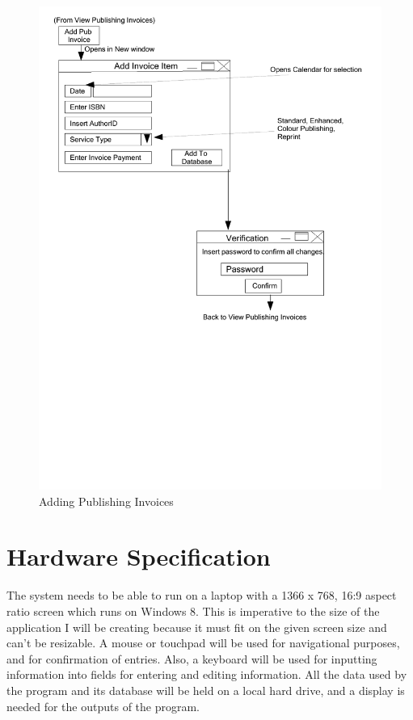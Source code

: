 \begin{figure}[H]
    \caption{Adding Publishing Invoices} \label{AddPubInvoice.pdf}
    \includegraphics[width=\textwidth]{./Design/UserInterfaceDesign/AddPubInvoice.pdf}
\end{figure}

\section{Hardware Specification}

The system needs to be able to run on a laptop with a 1366 x 768, 16:9 aspect ratio screen which runs on Windows 8. This is imperative to the size of the application I will be creating because it must fit on the given screen size and can't be resizable. A mouse or touchpad will be used for navigational purposes, and for confirmation of entries. Also, a keyboard will be used for inputting information into fields for entering and editing information. All the data used by the program and its database will be held on a local hard drive, and a display is needed for the outputs of the program.

